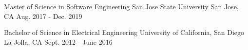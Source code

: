 

\begin{cventries}

  \cventryeducation
    {Master of Science in Software Engineering} %
    {San Jose State University} %
    {San Jose, CA} %
    {Aug. 2017 - Dec. 2019} %

  \cventryeducation
    {Bachelor of Science in Electrical Engineering} %
    {University of California, San Diego} %
    {La Jolla, CA} %
    {Sept. 2012 - June 2016} %

   

\end{cventries}
